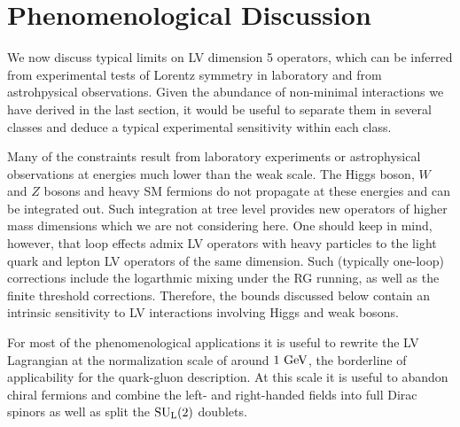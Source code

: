 \documentclass[12pt,preprintnumbers,nofootinbib]{revtex4}
\newcommand{\sul}{{{\rm SU}_{\rm L}(2)}}
\newcommand{\GeV}{{\rm GeV}}
\begin{document}
%
%
\section{Phenomenological Discussion}
\label{phenomenology}

	We now discuss typical limits on LV dimension 5 operators, 
	which can be inferred from experimental tests 
	of Lorentz symmetry in laboratory and from astrohpysical observations.
	Given the abundance of non-minimal interactions we have derived in 
	the last section, it would be useful to separate them in several classes 
    and deduce a typical experimental sensitivity within each class.
	
	Many of the constraints result from laboratory experiments
	or astrophysical observations at energies much lower
	than the weak scale. 
	The Higgs boson, $W$ and $Z$  bosons and heavy SM fermions 
    do not propagate 
	at these energies and can be integrated out.  Such integration at tree level 
    provides new operators of 
	higher mass dimensions which we are not considering here.
	One should keep in mind, however, that loop effects
	admix LV operators with heavy particles to the light quark and lepton 
    LV operators of the same dimension. Such (typically one-loop) corrections 
    include the logarthmic mixing under the RG running,
    as well as the finite threshold corrections. 
	Therefore, the bounds discussed below contain an intrinsic sensitivity to LV 
	interactions involving Higgs and weak bosons. 
	

	For most of the phenomenological applications it 
 is useful to rewrite the LV  Lagrangian at the normalization scale of
	around $ 1~\GeV $, the borderline of applicability for the quark-gluon description.
	At this scale it is useful to abandon chiral fermions and combine the left- and right-handed
fields into
	full Dirac spinors as well as split the
	$ \sul $ doublets. 
	
\end{document}
